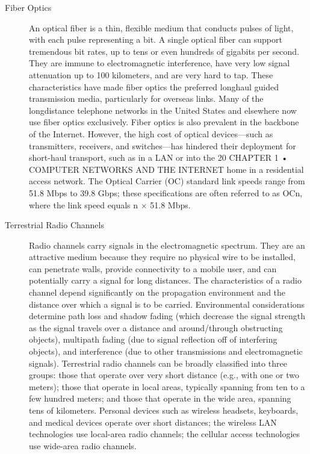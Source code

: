 \documentclass{article}
\begin{document}
\begin{description}
    \item[Fiber Optics] An optical fiber is a thin, flexible medium that conducts pulses of light, with each
    pulse representing a bit. A single optical fiber can support tremendous bit rates, up
    to tens or even hundreds of gigabits per second. They are immune to electromagnetic
    interference, have very low signal attenuation up to 100 kilometers, and are
    very hard to tap. These characteristics have made fiber optics the preferred longhaul
    guided transmission media, particularly for overseas links. Many of the longdistance
    telephone networks in the United States and elsewhere now use fiber optics
    exclusively. Fiber optics is also prevalent in the backbone of the Internet. However,
    the high cost of optical devices—such as transmitters, receivers, and switches—has
    hindered their deployment for short-haul transport, such as in a LAN or into the
    20 CHAPTER 1 • COMPUTER NETWORKS AND THE INTERNET
    home in a residential access network. The Optical Carrier (OC) standard link speeds
    range from 51.8 Mbps to 39.8 Gbps; these specifications are often referred to as OCn,
    where the link speed equals n × 51.8 Mbps.

    \item[Terrestrial Radio Channels] Radio channels carry signals in the electromagnetic spectrum. They are an attractive
    medium because they require no physical wire to be installed, can penetrate walls,
    provide connectivity to a mobile user, and can potentially carry a signal for long distances.
    The characteristics of a radio channel depend significantly on the propagation
    environment and the distance over which a signal is to be carried. Environmental considerations
    determine path loss and shadow fading (which decrease the signal strength
    as the signal travels over a distance and around/through obstructing objects), multipath
    fading (due to signal reflection off of interfering objects), and interference (due
    to other transmissions and electromagnetic signals).
    Terrestrial radio channels can be broadly classified into three groups: those that
    operate over very short distance (e.g., with one or two meters); those that operate in
    local areas, typically spanning from ten to a few hundred meters; and those that
    operate in the wide area, spanning tens of kilometers. Personal devices such as wireless
    headsets, keyboards, and medical devices operate over short distances; the
    wireless LAN technologies use local-area radio channels;
    the cellular access technologies use wide-area radio channels.


\end{description}
\end{document}
